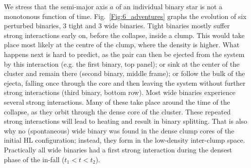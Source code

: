 We stress that the semi-major axis $a$ of an individual binary star is not a monotonous function of time. 
Fig.~\ref{Fig:6_adventures} graphs the evolution of six perturbed binaries, 3 tight and 3 wide binaries. 
Tight binaries mostly suffer strong interactions early on, before the collapse, inside a clump. This would take place  most likely at the centre of the clump, where the density is higher. What happens next is hard to predict, as the pair can then be ejected from the system by this interaction (e.g. the first binary, top panel); or  sink at the center of the cluster and remain there (second binary, middle frame); or follow the bulk of the ejecta,  falling once through the core and then leaving the system without further strong interactions  (third binary, bottom row). 
Most wide binaries experience several strong interactions. Many of these  %
take place around the time of the collapse, as they orbit  through the dense core of the cluster. These repeated strong 
interactions will lead to heating and result in binary splitting. That is also why  
no (spontaneous) wide binary was found in  the  dense  clump cores of the initial HL configuration; instead, they form in the low-density inter-clump space. Practically all wide binaries had a first strong interaction during the densest phase of the in-fall ($t_1 < t < t_2$). 
